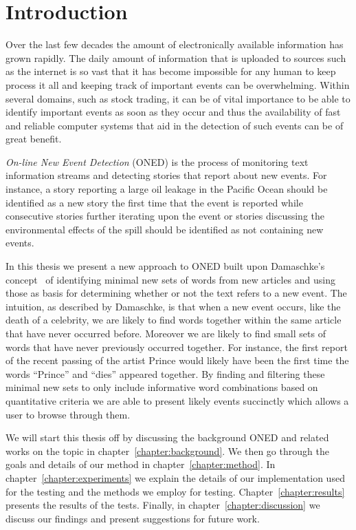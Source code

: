 \chapter{Introduction}
\label{chapter:introduction}
Over the last few decades the amount of electronically available information has grown rapidly. The daily amount of information that is uploaded to sources such as the internet is so vast that it has become impossible for any human to keep process it all and keeping track of important events can be overwhelming. Within several domains, such as stock trading, it can be of vital importance to be able to identify important events as soon as they occur and thus the availability of fast and reliable computer systems that aid in the detection of such events can be of great benefit. 

\emph{On-line New Event Detection} (ONED) is the process of monitoring text information streams and detecting stories that report about new events. For instance, a story reporting a large oil leakage in the Pacific Ocean should be identified as a new story the first time that the event is reported while consecutive stories further iterating upon the event or stories discussing the environmental effects of the spill should be identified as not containing new events. 

In this thesis we present a new approach to ONED built upon Damaschke's concept~\cite{damaschke2015pairs} of identifying minimal new sets of words from new articles and using those as basis for determining whether or not the text refers to a new event. The intuition, as described by Damaschke, is that when a new event occurs, like the death of a celebrity, we are likely to find words together within the same article that have never occurred before. Moreover we are likely to find small sets of words that have never previously occurred together. For instance, the first report of the recent passing of the artist Prince would likely have been the first time the words ``Prince'' and ``dies'' appeared together. By finding and filtering these minimal new sets to only include informative word combinations based on quantitative criteria we are able to present likely events succinctly which allows a user to browse through them.

We will start this thesis off by discussing the background ONED and related works on the topic in chapter~\ref{chapter:background}. We then go through the goals and details of our method in chapter~\ref{chapter:method}. In chapter~\ref{chapter:experiments} we explain the details of our implementation used for the testing and the methods we employ for testing. Chapter~\ref{chapter:results} presents the results of the tests. Finally, in chapter~\ref{chapter:discussion} we discuss our findings and present suggestions for future work.
